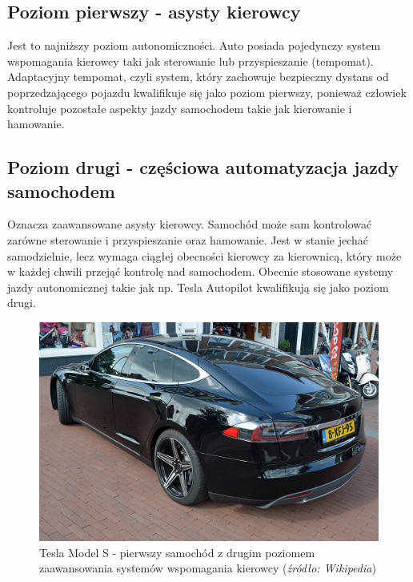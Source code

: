 \subsection{Poziom pierwszy - asysty kierowcy}
Jest to najniższy poziom autonomiczności. Auto posiada pojedynczy system wspomagania kierowcy taki jak sterowanie lub przyspieszanie (tempomat). Adaptacyjny tempomat, czyli system, który zachowuje bezpieczny dystans od poprzedzającego pojazdu kwalifikuje się jako poziom pierwszy, ponieważ człowiek kontroluje pozostałe aspekty jazdy samochodem takie jak kierowanie i hamowanie.

\subsection{Poziom drugi - częściowa automatyzacja jazdy samochodem}
Oznacza zaawansowane asysty kierowcy. Samochód może sam kontrolować zarówne sterowanie i przyspieszanie oraz hamowanie. Jest w stanie jechać samodzielnie, lecz wymaga ciągłej obecności kierowcy za kierownicą, który może w każdej chwili przejąć kontrolę nad samochodem. Obecnie stosowane systemy jazdy autonomicznej takie jak np. Tesla Autopilot kwalifikują się jako poziom drugi.

\begin{figure}
  \centering
  \includegraphics[width=12cm]{img/tesla.jpg}
  \caption{Tesla Model S - pierwszy samochód z drugim poziomem zaawansowania systemów wspomagania kierowcy (\textit{źródło: Wikipedia})}
  \label{fig:teslas}
\end{figure}

